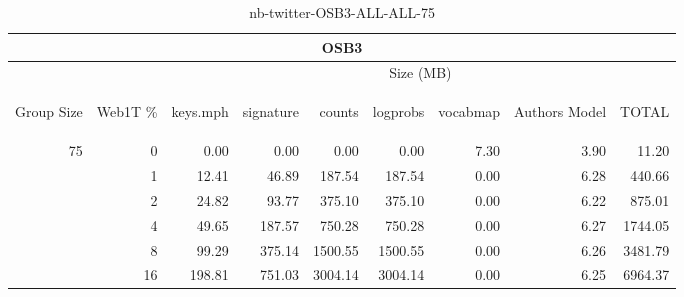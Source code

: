 \begin{center}
\begin{table}[htbp]
\begin{tabular}{ | r | r | r | r | r | r | r | r | r |}
\hline
\multicolumn{9}{|c|}{OSB3}\\
\hline
 & & \multicolumn{7}{|c|}{Size (MB)}\\ \cline{3-9}
\begin{sideways}Group Size\end{sideways} & \begin{sideways}Web1T \% \end{sideways} & \begin{sideways}keys.mph\end{sideways} & \begin{sideways}signature\end{sideways} & \begin{sideways}counts\end{sideways} & \begin{sideways}logprobs\end{sideways} & \begin{sideways}vocabmap\end{sideways} & \begin{sideways}Authors Model \end{sideways} & \begin{sideways}TOTAL\end{sideways}\\
\hline
\multirow{5}{*}{75}
 & 0 & 0.00 & 0.00 & 0.00 & 0.00 & 7.30 & 3.90 & 11.20\\ \cline{2-9}
 & 1 & 12.41 & 46.89 & 187.54 & 187.54 & 0.00 & 6.28 & 440.66\\ \cline{2-9}
 & 2 & 24.82 & 93.77 & 375.10 & 375.10 & 0.00 & 6.22 & 875.01\\ \cline{2-9}
 & 4 & 49.65 & 187.57 & 750.28 & 750.28 & 0.00 & 6.27 & 1744.05\\ \cline{2-9}
 & 8 & 99.29 & 375.14 & 1500.55 & 1500.55 & 0.00 & 6.26 & 3481.79\\ \cline{2-9}
 & 16 & 198.81 & 751.03 & 3004.14 & 3004.14 & 0.00 & 6.25 & 6964.37\\ \cline{2-9}
\hline
\end{tabular}
\caption{nb-twitter-OSB3-ALL-ALL-75}
\label{table:nb-twitter-OSB3-ALL-ALL-75}
\end{table}
\end{center}

